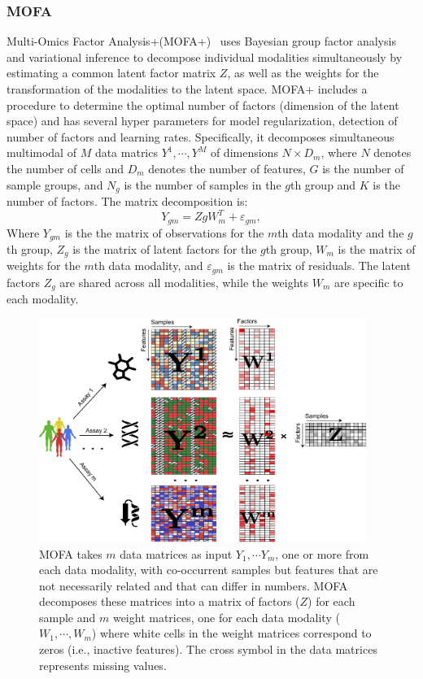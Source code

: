 \subsubsection{MOFA}
Multi-Omics Factor Analysis+(MOFA+)~\cite{argelaguet2020mofa+} uses Bayesian group factor analysis and variational inference to decompose individual modalities simultaneously by estimating a common latent factor matrix $Z$, as well as the weights for the transformation of the modalities to the latent space. MOFA+ includes a procedure to determine the optimal number of factors (dimension of the latent space) and has several hyper parameters for model regularization, detection of number of factors and learning rates. Specifically, it decomposes simultaneous multimodal of $M$ data matrics $Y^1, \cdots, Y^M$ of dimensions $N\times D_m$, where $N$ denotes the number of cells and $D_m$ denotes the number of features, $G$ is the number of sample groups, and $N_g$ is the number of samples in the $g$th group and $K$ is the number of factors. The matrix decomposition is:
\begin{equation}
Y_{gm} = ZgW_m^{T} + \varepsilon_{gm}, 
\end{equation}
Where $Y_{gm}$ is the the matrix of observations for the $m$th data modality and the $g$th group, $Z_g$ is the matrix of latent factors for the $g$th group, $W_m$ is the matrix of weights for the $m$th data modality, and $\varepsilon_{gm}$ is the matrix of residuals. The latent factors $Z_g$ are shared across all modalities, while the weights $W_m$ are specific to each modality. %


\begin{figure}[!hb]
	\centering
	\includegraphics[width=0.95\textwidth]{Alg_MOFA/fig}
	\vspace{0.1cm}
	\caption[Illustration of MOFA integration competing method.]{
	MOFA takes $m$ data matrices as input $Y_1, \cdots Y_m$, one or more from each data modality, with co-occurrent samples but features that are not necessarily related and that can differ in numbers. MOFA decomposes these matrices into a matrix of factors ($Z$) for each sample and $m$ weight matrices, one for each data modality ($W_1,\cdots, W_m$) where white cells in the weight matrices correspond to zeros (i.e., inactive features). The cross symbol in the data matrices represents missing values. 
}
	\label{fig:Alg_MOFA}
\end{figure}


